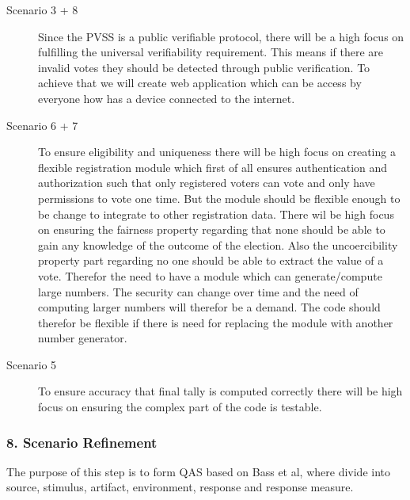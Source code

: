 \begin{description}
    \item [Scenario 3 + 8]
        Since the PVSS is a public verifiable protocol, there will be a high focus on fulfilling the universal verifiability requirement. This means if there are invalid votes they should be detected through public verification. To achieve that we will create web application which can be access by everyone how has a device connected to the internet. 
    
    \item [Scenario 6 + 7]    
        To ensure eligibility and uniqueness there will be high focus on creating a flexible registration module which first of all ensures authentication and authorization such that only registered voters can vote and only have permissions to vote one time. But the module should be flexible enough to be change to integrate to other registration data. There wil be high focus on ensuring the fairness property regarding that none should be able to gain any knowledge of the outcome of the election. Also the uncoercibility property part regarding no one should be able to extract the value of a vote. Therefor the need to have a module which can generate/compute large numbers. The security can change over time and the need of computing larger numbers will therefor be a demand. The code should therefor be flexible if there is need for replacing the module with another number generator.  
        
    \item [Scenario 5]
        To ensure accuracy that final tally is computed correctly there will be high focus on ensuring the complex part of the code is testable.    
    
  \end{description}




\subsubsection{8. Scenario Refinement}
The purpose of this step is to form QAS based on Bass et al, where divide into source, stimulus, artifact, environment, response and response measure. 


